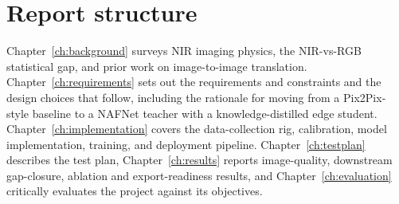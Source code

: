 \section{Report structure}
\label{sec:intro_structure}

Chapter~\ref{ch:background} surveys NIR imaging physics, the NIR-vs-RGB statistical gap, and prior work on image-to-image translation. Chapter~\ref{ch:requirements} sets out the requirements and constraints and the design choices that follow, including the rationale for moving from a Pix2Pix-style baseline to a NAFNet teacher with a knowledge-distilled edge student. Chapter~\ref{ch:implementation} covers the data-collection rig, calibration, model implementation, training, and deployment pipeline. Chapter~\ref{ch:testplan} describes the test plan, Chapter~\ref{ch:results} reports image-quality, downstream gap-closure, ablation and export-readiness results, and Chapter~\ref{ch:evaluation} critically evaluates the project against its objectives.
